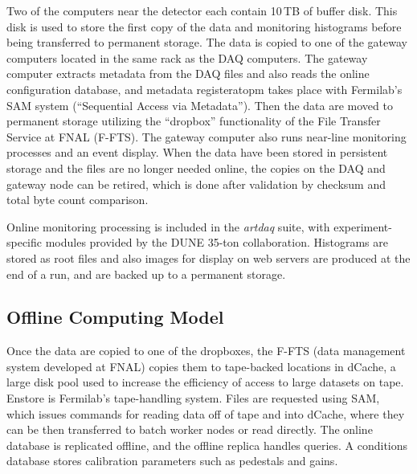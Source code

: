 Two of the computers near the detector each contain 10\,TB of buffer disk.  This disk is used to store the first copy of
the data and monitoring histograms before being transferred to permanent storage. The data is copied
to one of the gateway computers located in the same rack as the DAQ computers.  The gateway computer
extracts metadata from the DAQ files and also reads the online configuration database, and 
metadata registeratopm takes place with Fermilab's  SAM system (``Sequential Access via Metadata'').
Then the data are moved to permanent storage utilizing the ``dropbox'' functionality of the File Transfer Service at FNAL (F-FTS).
The gateway computer also runs near-line monitoring processes and an event display.
When the data have been stored in persistent storage and the files are no longer needed online,
the copies on the DAQ and gateway node can be retired, which is done after validation by checksum and
total byte count comparison.

Online monitoring processing is included in the {\it artdaq} suite, with experiment-specific modules
provided by the DUNE 35-ton collaboration.  Histograms are stored as root files and also
images for display on web servers are produced at the end of a run, and are backed up
to a permanent storage.


\subsection{Offline Computing Model}

Once the data are copied to one of the dropboxes, the F-FTS (data management system developed at FNAL)
copies them to tape-backed locations in dCache,
a large disk pool used to increase the efficiency of access to large datasets on tape.  Enstore is Fermilab's
tape-handling system.  Files are requested using SAM, which issues commands for reading data off of tape
and into dCache, where they can be then transferred to batch worker nodes or read directly.  
The online database is replicated offline, and the offline replica handles queries.  A conditions database
stores calibration parameters such as pedestals and gains.


